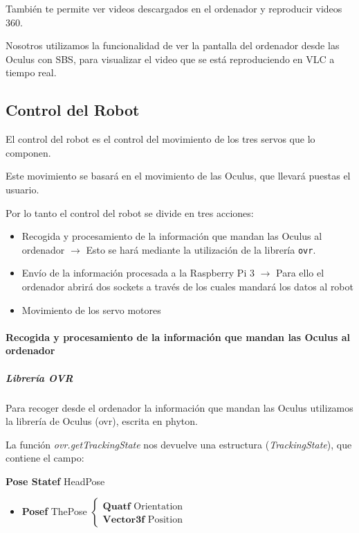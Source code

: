 \documentclass[twoside, 12pt]{epstfg}
\begin{document}

También te permite ver videos descargados en el ordenador y reproducir videos 360.

Nosotros utilizamos la funcionalidad de ver la pantalla del ordenador desde las Oculus con SBS, para visualizar el video que se está reproduciendo en VLC a tiempo real.



\newpage

\subsection{Control del Robot}
El control del robot es el control del movimiento de los tres servos que lo componen. 

Este movimiento se basará en el movimiento de las Oculus, que llevará puestas el usuario.

Por lo tanto el control del robot se divide en tres acciones:
\begin{itemize}
	\item Recogida y procesamiento de la información que mandan las Oculus al ordenador $\rightarrow$ Esto se hará mediante la utilización de la librería \texttt{ovr}.
	
	\item Envío de la información procesada a la Raspberry Pi 3 $\rightarrow$ Para ello el ordenador abrirá dos sockets a través de los cuales mandará los datos al robot
	
	\item Movimiento de los servo motores
\end{itemize}
\paragraph{Recogida y procesamiento de la información que mandan las Oculus al ordenador}


\subparagraph{Librería OVR}
Para recoger desde el ordenador la información que mandan las Oculus utilizamos la librería de Oculus (ovr), escrita en phyton.

La función \textit{ovr.getTrackingState} nos devuelve una estructura (\textit{TrackingState}), que contiene el campo:

\textbf{Pose Statef} HeadPose 
\begin{itemize}
	\item \textbf{Posef} ThePose $\begin{cases}
	\textbf{Quatf} \text{ Orientation}\\
	\textbf{Vector3f}\text{ Position} 
	\end{cases}$
	
	
\end{itemize}
\end{document}
